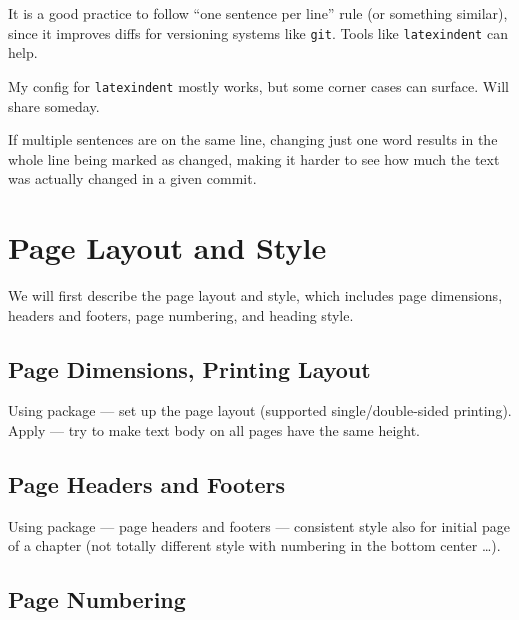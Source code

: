 \begin{remark}
    It is a good practice to follow \enquote{one sentence per line} rule (or something similar), since it improves diffs for versioning systems like \texttt{git}.
    Tools like \texttt{latexindent} can help.
    \begin{Note}
        My config for \texttt{latexindent} mostly works, but some corner cases can surface.
        Will share someday.
    \end{Note}
    If multiple sentences are on the same line, changing just one word results in the whole line being marked as changed, making it harder to see how much the text was actually changed in a given commit.
\end{remark}



\section{Page Layout and Style}%
\label{sec:Page Layout}

We will first describe the page layout and style, which includes page dimensions, headers and footers, page numbering, and heading style.

\subsection{Page Dimensions, Printing Layout}%
\label{sub:Page Dimensions}

Using  package --- set up the page layout (supported single/double-sided printing).
Apply \macro{\flushbottom} --- try to make text body on all pages have the same height.

\subsection{Page Headers and Footers}%
\label{sub:Headers Footers}

Using  package --- page headers and footers --- consistent style also for initial page of a chapter (not totally different style with numbering in the bottom center \ldots).

\subsection{Page Numbering}%
\label{sub:Page Numbering}

